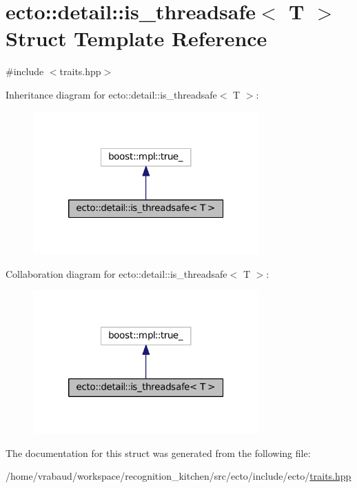 \hypertarget{structecto_1_1detail_1_1is__threadsafe}{\section{ecto\-:\-:detail\-:\-:is\-\_\-threadsafe$<$ T $>$ Struct Template Reference}
\label{structecto_1_1detail_1_1is__threadsafe}
}


{\ttfamily \#include $<$traits.\-hpp$>$}



Inheritance diagram for ecto\-:\-:detail\-:\-:is\-\_\-threadsafe$<$ T $>$\-:\nopagebreak
\begin{figure}[H]
\begin{center}
\leavevmode
\includegraphics[width=246pt]{structecto_1_1detail_1_1is__threadsafe__inherit__graph}
\end{center}
\end{figure}


Collaboration diagram for ecto\-:\-:detail\-:\-:is\-\_\-threadsafe$<$ T $>$\-:\nopagebreak
\begin{figure}[H]
\begin{center}
\leavevmode
\includegraphics[width=246pt]{structecto_1_1detail_1_1is__threadsafe__coll__graph}
\end{center}
\end{figure}


The documentation for this struct was generated from the following file\-:\begin{DoxyCompactItemize}
\item 
/home/vrabaud/workspace/recognition\-\_\-kitchen/src/ecto/include/ecto/\hyperlink{traits_8hpp}{traits.\-hpp}\end{DoxyCompactItemize}
